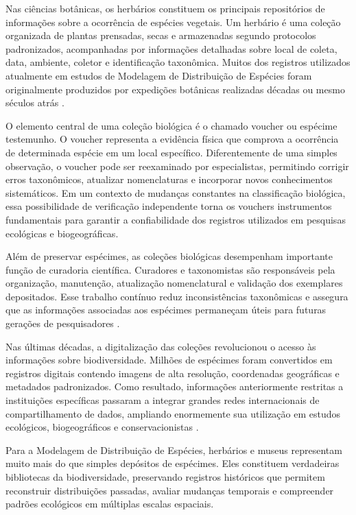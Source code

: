 Nas ciências botânicas, os herbários constituem os principais repositórios de informações sobre a ocorrência de espécies vegetais. Um herbário é uma coleção organizada de plantas prensadas, secas e armazenadas segundo protocolos padronizados, acompanhadas por informações detalhadas sobre local de coleta, data, ambiente, coletor e identificação taxonômica. Muitos dos registros utilizados atualmente em estudos de Modelagem de Distribuição de Espécies foram originalmente produzidos por expedições botânicas realizadas décadas ou mesmo séculos atrás \parencite{funk2018collections}.

O elemento central de uma coleção biológica é o chamado voucher ou espécime testemunho. O voucher representa a evidência física que comprova a ocorrência de determinada espécie em um local específico. Diferentemente de uma simples observação, o voucher pode ser reexaminado por especialistas, permitindo corrigir erros taxonômicos, atualizar nomenclaturas e incorporar novos conhecimentos sistemáticos. Em um contexto de mudanças constantes na classificação biológica, essa possibilidade de verificação independente torna os vouchers instrumentos fundamentais para garantir a confiabilidade dos registros utilizados em pesquisas ecológicas e biogeográficas.

Além de preservar espécimes, as coleções biológicas desempenham importante função de curadoria científica. Curadores e taxonomistas são responsáveis pela organização, manutenção, atualização nomenclatural e validação dos exemplares depositados. Esse trabalho contínuo reduz inconsistências taxonômicas e assegura que as informações associadas aos espécimes permaneçam úteis para futuras gerações de pesquisadores \parencite{pyke2010biological}.

Nas últimas décadas, a digitalização das coleções revolucionou o acesso às informações sobre biodiversidade. Milhões de espécimes foram convertidos em registros digitais contendo imagens de alta resolução, coordenadas geográficas e metadados padronizados. Como resultado, informações anteriormente restritas a instituições específicas passaram a integrar grandes redes internacionais de compartilhamento de dados, ampliando enormemente sua utilização em estudos ecológicos, biogeográficos e conservacionistas \parencite{nelson2015digitization}.

Para a Modelagem de Distribuição de Espécies, herbários e museus representam muito mais do que simples depósitos de espécimes. Eles constituem verdadeiras bibliotecas da biodiversidade, preservando registros históricos que permitem reconstruir distribuições passadas, avaliar mudanças temporais e compreender padrões ecológicos em múltiplas escalas espaciais.

